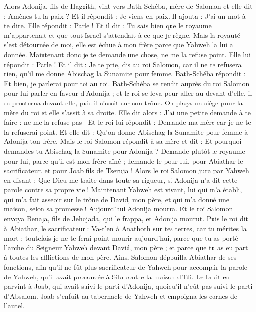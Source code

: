 \begin{multicols}{2}
Alors Adonija, fils de Haggith, vint vers Bath-Schéba, mère de Salomon et elle dit : Amènes-tu la paix ? Et il répondit : Je viens en paix.
Il ajouta : J'ai un mot à te dire. Elle répondit : Parle !
Et il dit : Tu sais bien que le royaume m'appartenait et que tout Israël s'attendait à ce que je règne. Mais la royauté s’est détournée de moi, elle est échue à mon frère parce que Yahweh la lui a donnée.
Maintenant donc je te demande une chose, ne me la refuse point. Elle lui répondit : Parle !
Et il dit : Je te prie, dis au roi Salomon, car il ne te refusera rien, qu'il me donne Abischag la Sunamite pour femme.
Bath-Schéba répondit : Et bien, je parlerai pour toi au roi.
Bath-Schéba se rendit auprès du roi Salomon pour lui parler en faveur d’Adonija ; et le roi se leva pour aller au-devant d’elle, il se prosterna devant elle, puis il s'assit sur son trône. On plaça un siège pour la mère du roi et elle s'assit à sa droite.
Elle dit alors : J'ai une petite demande à te faire : ne me la refuse pas ! Et le roi lui répondit : Demande ma mère car je ne te la refuserai point.
Et elle dit : Qu'on donne Abischag la Sunamite pour femme à Adonija ton frère.
Mais le roi Salomon répondit à sa mère et dit : Et pourquoi demandes-tu Abischag la Sunamite pour Adonija ? Demande plutôt le royaume pour lui, parce qu'il est mon frère aîné ; demande-le pour lui, pour Abiathar le sacrificateur, et pour Joab fils de Tseruja !
Alors le roi Salomon jura par Yahweh en disant : Que Dieu me traite dans toute sa rigueur, si Adonija n'a dit cette parole contre sa propre vie !
Maintenant Yahweh est vivant, lui qui m'a établi, qui m'a fait asseoir sur le trône de David, mon père, et qui m'a donné une maison, selon sa promesse ! Aujourd’hui Adonija mourra.
Et le roi Salomon envoya Benaja, fils de Jehojada, qui le frappa, et Adonija mourut.
Puis le roi dit à Abiathar, le sacrificateur : Va-t'en à Anathoth sur tes terres, car tu mérites la mort ; toutefois je ne te ferai point mourir aujourd'hui, parce que tu as porté l'arche du Seigneur Yahweh devant David, mon père ; et parce que tu as eu part à toutes les afflictions de mon père.
Ainsi Salomon dépouilla Abiathar de ses fonctions, afin qu'il ne fût plus sacrificateur de Yahweh pour accomplir la parole de Yahweh, qu'il avait prononcée à Silo contre la maison d'Eli.
Le bruit en parvint à Joab, qui avait suivi le parti d’Adonija, quoiqu'il n’eût pas suivi le parti d’Absalom. Joab s'enfuit au tabernacle de Yahweh et empoigna les cornes de l'autel.

\end{multicols}
